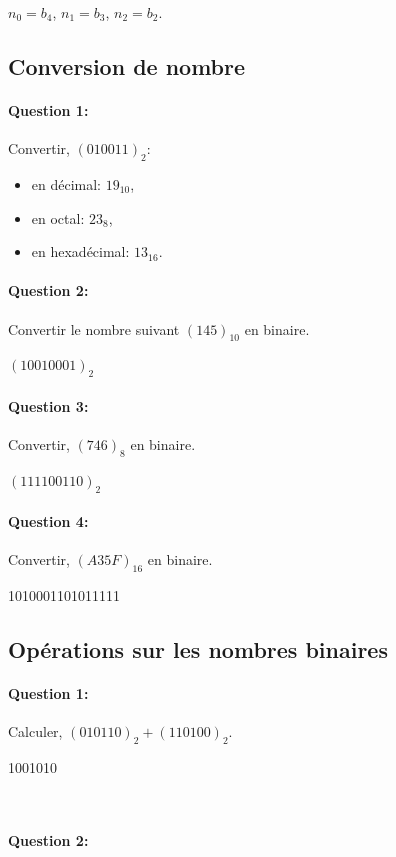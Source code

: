 $n_0=b_4$, $n_1=b_3$, $n_2=b_2$.

\subsection{Conversion de nombre}

\paragraph{Question 1:}

Convertir, $(010011)_{2}$:
\begin{itemize}
 \item en décimal: $19_{10}$,
 \item en octal: $23_{8}$,
 \item en hexadécimal: $13_{16}$.
\end{itemize}

\paragraph{Question 2:}

Convertir le nombre suivant $(145)_{10}$ en binaire.

$(10010001)_{2}$

\paragraph{Question 3:} Convertir, $(746)_{8}$ en binaire.

$(111100110)_{2}$

\paragraph{Question 4:} Convertir, $(A35F)_{16}$ en binaire.

1010001101011111

\subsection{Opérations sur les nombres binaires}

\paragraph{Question 1:}

Calculer, $(010110)_{2}+(110100)_{2}$.

1001010

~\

\paragraph{Question 2:}

